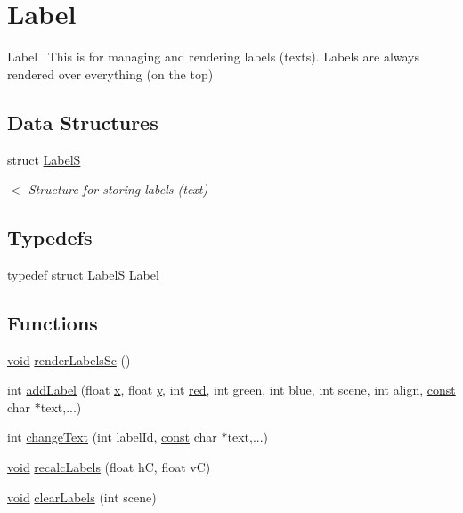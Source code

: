 \hypertarget{group___label}{}\section{Label}
\label{group___label}


Label~\newline
This is for managing and rendering labels (texts). Labels are always rendered over everything (on the top)  


\subsection*{Data Structures}
\begin{DoxyCompactItemize}
\item 
struct \hyperlink{struct_label_s}{LabelS}
\begin{DoxyCompactList}\small\item\em $<$ Structure for storing labels (text) \end{DoxyCompactList}\end{DoxyCompactItemize}
\subsection*{Typedefs}
\begin{DoxyCompactItemize}
\item 
typedef struct \hyperlink{struct_label_s}{LabelS} \hyperlink{group___label_gab5319af999278b49f29385da80cb46e7}{Label}
\end{DoxyCompactItemize}
\subsection*{Functions}
\begin{DoxyCompactItemize}
\item 
\hyperlink{png_8h_ac9c84fa68bbad002983e35ce3663c686}{void} \hyperlink{group___label_gac4652cfefc2d18651dd3ef401b6be15f}{render\+Labels\+Sc} ()
\item 
int \hyperlink{group___label_ga0530c926875e32c0f86862477dd71556}{add\+Label} (float \hyperlink{fmaths_8inl_a7ba8ab2f1e8f362163e17da3f15a5db9}{x}, float \hyperlink{fmaths_8inl_ad01ab75ae50a1a624185bfa014c66cfa}{y}, int \hyperlink{png_8h_a785e03b9f52b7b9ca5116a272adc908f}{red}, int green, int blue, int scene, int align, \hyperlink{zconf_8h_a2c212835823e3c54a8ab6d95c652660e}{const} char $\ast$text,...)
\item 
int \hyperlink{group___label_ga7258b92504aab236bca87a8ee0efa7e3}{change\+Text} (int label\+Id, \hyperlink{zconf_8h_a2c212835823e3c54a8ab6d95c652660e}{const} char $\ast$text,...)
\item 
\hyperlink{png_8h_ac9c84fa68bbad002983e35ce3663c686}{void} \hyperlink{group___label_ga44b3716da30f10b061357af0c53d19ac}{recalc\+Labels} (float hC, float vC)
\item 
\hyperlink{png_8h_ac9c84fa68bbad002983e35ce3663c686}{void} \hyperlink{group___label_ga5fd3c25c35d1f13655c76541995ebb26}{clear\+Labels} (int scene)
\end{DoxyCompactItemize}


